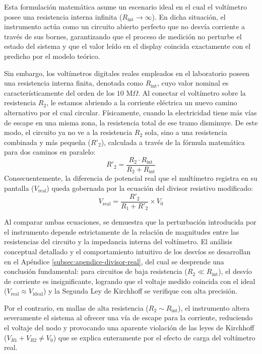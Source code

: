Esta formulación matemática asume un escenario ideal en el cual el voltímetro posee una resistencia interna infinita ($R_{\text{int}} \to \infty$). En dicha situación, el instrumento actúa como un circuito abierto perfecto que no desvía corriente a través de sus bornes, garantizando que el proceso de medición no perturbe el estado del sistema y que el valor leído en el display coincida exactamente con el predicho por el modelo teórico.

Sin embargo, los voltímetros digitales reales empleados en el laboratorio poseen una resistencia interna finita, denotada como $R_{\text{int}}$, cuyo valor nominal es característicamente del orden de los $10\text{ M}\Omega$. Al conectar el voltímetro sobre la resistencia $R_2$, le estamos abriendo a la corriente eléctrica un nuevo camino alternativo por el cual circular. Físicamente, cuando la electricidad tiene más vías de escape en una misma zona, la resistencia total de ese tramo disminuye. De este modo, el circuito ya no ve a la resistencia $R_2$ sola, sino a una resistencia combinada y más pequeña ($R'_2$), calculada a través de la fórmula matemática para dos caminos en paralelo:
\begin{equation}
    R'_2 = \frac{R_2 \cdot R_{\text{int}}}{R_2 + R_{\text{int}}}
\label{eq:paralelo-real}
\end{equation}
Consecuentemente, la diferencia de potencial real que el multímetro registra en su pantalla ($V_{\text{real}}$) queda gobernada por la ecuación del divisor resistivo modificado:
\begin{equation}
    V_{\text{real}} = \frac{R'_2}{R_1 + R'_2} \times V_0
\label{eq:divisor-real}
\end{equation}

Al comparar ambas ecuaciones, se demuestra que la perturbación introducida por el instrumento depende estrictamente de la relación de magnitudes entre las resistencias del circuito y la impedancia interna del voltímetro. El análisis conceptual detallado y el comportamiento intuitivo de los desvíos se desarrollan en el Apéndice \ref{subsec:apendice-divisor-real}, del cual se desprende una conclusión fundamental: para circuitos de baja resistencia ($R_2 \ll R_{\text{int}}$), el desvío de corriente es insignificante, logrando que el voltaje medido coincida con el ideal ($V_{\text{real}} \approx V_{\text{ideal}}$) y la Segunda Ley de Kirchhoff se verifique con alta precisión. 

Por el contrario, en mallas de alta resistencia ($R_2 \sim R_{\text{int}}$), el instrumento altera severamente el sistema al ofrecer una vía de escape para la corriente, reduciendo el voltaje del nodo y provocando una aparente violación de las leyes de Kirchhoff ($V_{R1} + V_{R2} \neq V_0$) que se explica enteramente por el efecto de carga del voltímetro real.